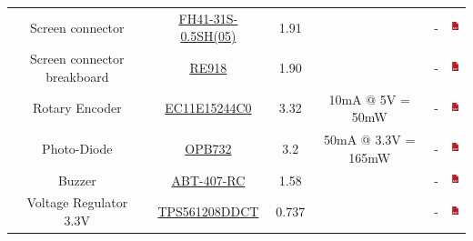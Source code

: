 \documentclass[12pt,a4paper,landscape]{article}
\begin{document}
{\begin{tabular}{|c|c|c|c|c|c|}
					Screen connector &
					\href{http://fr.farnell.com/hirose-hrs/fh41-31s-0-5sh-05/conn-ffc-embase-31voies-1rangee/dp/2427829}
					{FH41-31S-0.5SH(05)} & 1.91 & &
					- &
					\href{http://www.farnell.com/datasheets/2169332.pdf}{\includegraphics[height=1em]{pdf.png}}\\
					
					Screen connector breakboard &
					\href{http://uk.farnell.com/roth-elektronik/re918/fpc-ffc-adaptor-fibreglass-1-5mm/dp/2474691?st=adaptor}
					{RE918} & 1.90 & &
					- &
					\href{http://www.farnell.com/datasheets/2169332.pdf}{\includegraphics[height=1em]{pdf.png}}\\
					
					Rotary Encoder &
					\href{http://fr.farnell.com/alps/ec11e15244c0/encodeur-vert-30-crans-15-impul/dp/1520806?st=boutton}
					{EC11E15244C0} & 3.32 & 10mA @ 5V = 50mW & 
					- &
					\href{http://www.farnell.com/datasheets/5205.pdf}{\includegraphics[height=1em]{pdf.png}}\\
					
					Photo-Diode &
					\href{http://fr.farnell.com/optek-technology/opb732/capteur-reflectif-pcb/dp/1226877}
					{OPB732} & 3.2 & 50mA @ 3.3V = 165mW &
					- &
					\href{http://www.farnell.com/datasheets/2331536.pdf}{\includegraphics[height=1em]{pdf.png}}\\
					    
					Buzzer &
					\href{http://fr.farnell.com/pro-signal/abt-407-rc/transducteur-electro-mech-audio/dp/2098835}
					{ABT-407-RC} & 1.58 & &
					- & \href{http://www.farnell.com/datasheets/1563663.pdf}{\includegraphics[height=1em]{pdf.png}}\\
					    
					Voltage Regulator 3.3V &
					\href{http://fr.farnell.com/texas-instruments/tps561208ddct/dc-dc-conv-sync-buck-580khz-sot/dp/2766883}
					{TPS561208DDCT} &  0.737 & &
					- &
					\href{http://www.ti.com/lit/ds/symlink/tps561201.pdf}{\includegraphics[height=1em]{pdf.png}}\\
					    

\end{tabular}}
\end{document}
